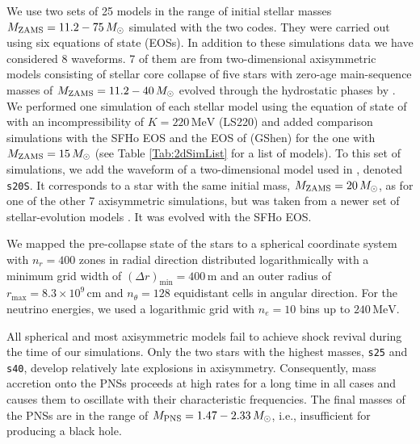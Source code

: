 We use two sets of 25 models in the range of initial stellar masses
$M_{\mathrm{ZAMS}} = 11.2 - 75 \, M_{\odot}$ simulated with the two codes.
They were carried out using six equations of state (EOSs).
In addition to these simulations data we have considered 8 waveforms.
7 of them are from two-dimensional axisymmetric models
consisting of stellar core collapse of five stars with zero-age
main-sequence masses of $M_{\mathrm{ZAMS}} = 11.2 - 40 \, M_{\odot}$
evolved through the hydrostatic phases by
\cite{Woosley_Heger_Weaver__2002__ReviewsofModernPhysics__The_evolution_and_explosion_of_massive_stars}.
We performed one simulation of each stellar model using the equation
of state of \cite{Lattimer_Swesty__1991__NuclearPhysicsA__LS-EOS} with
an incompressibility of $K = 220 \, \mathrm{MeV}$ (LS220) and added
comparison simulations with the SFHo EOS
\cite{Steiner_et_al__2013__apj__Core-collapseSupernovaEquationsofStateBasedonNeutronStarObservations}
and the EOS of
\cite{Shen_et_al__2011__prc__Newequationofstateforastrophysicalsimulations}
(GShen) for the one with $M_{\mathrm{ZAMS}} = 15 \, M_{\odot}$ (see Table
\ref{Tab:2dSimList} for a list of models).  To this set of
simulations, we add the waveform of a two-dimensional model used in
\cite{Torres:2019a}, denoted \texttt{s20S}.  It corresponds to a star
with the same initial mass, $M_{\mathrm{ZAMS}} = 20 \, M_{\odot}$, as for
one of the other 7 axisymmetric simulations, but was taken from a
newer set of stellar-evolution models
\cite{Woosley_Heger__2007__physrep__Nucleosynthesisandremnantsinmassivestarsofsolarmetallicity}.
It was evolved with the SFHo EOS.

We mapped the pre-collapse state of the stars to a spherical
coordinate system with $n_r = 400$ zones in radial direction
distributed logarithmically with a minimum grid width of
$(\Delta r)_{\mathrm{min}} = 400 \, \mathrm{m}$ and an outer radius of
$r_{\mathrm{max}} = 8.3 \times 10^{9} \, \mathrm{cm}$ and
$n_{\theta} = 128$ equidistant cells in angular direction.  For the
neutrino energies, we used a logarithmic grid with $n_e = 10$ bins up
to $240 \, \mathrm{MeV}$.

All spherical and most axisymmetric models fail to achieve shock
revival during the time of our simulations.  Only the two stars with
the highest masses, \texttt{s25} and \texttt{s40}, develop relatively
late explosions in axisymmetry.  Consequently, mass accretion onto the
PNSs proceeds at high rates for a long time in all cases and causes
them to oscillate with their characteristic frequencies.  The final
masses of the PNSs are in the range of
$M_{\mathrm{PNS}} = 1.47 - 2.33 \, M_{\odot}$, i.e., insufficient for
producing a black hole.

